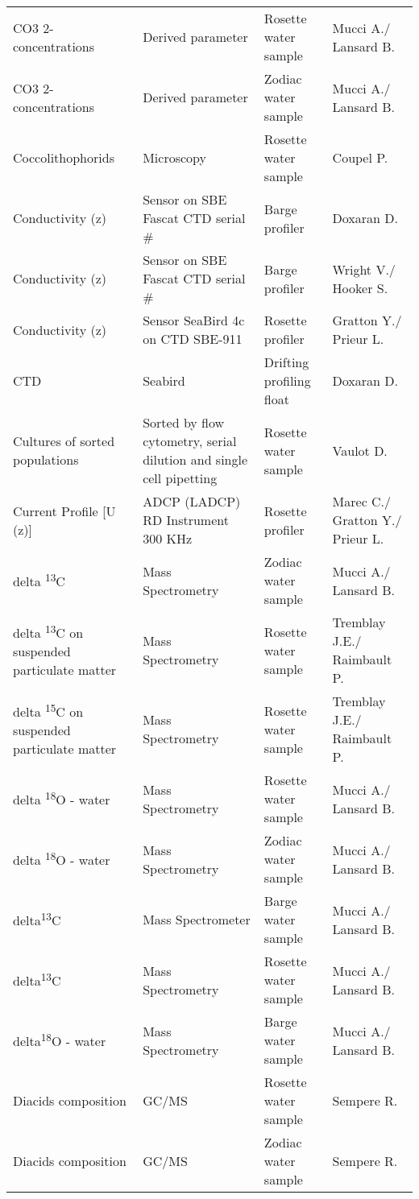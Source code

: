 \begin{longtable}[t]{llll}
CO3 2- concentrations & Derived parameter & Rosette water sample & Mucci A./ Lansard B.\\
\addlinespace
CO3 2- concentrations & Derived parameter & Zodiac water sample & Mucci A./ Lansard B.\\
Coccolithophorids & Microscopy & Rosette water sample & Coupel P.\\
Conductivity (z) & Sensor on SBE Fascat CTD serial \# & Barge profiler & Doxaran D.\\
Conductivity (z) & Sensor on SBE Fascat CTD serial \# & Barge profiler & Wright V./ Hooker S.\\
Conductivity (z) & Sensor SeaBird 4c on CTD SBE-911 & Rosette profiler & Gratton Y./ Prieur L.\\
\addlinespace
CTD & Seabird & Drifting profiling float & Doxaran D.\\
Cultures of sorted populations & Sorted by flow cytometry, serial dilution and single cell pipetting & Rosette water sample & Vaulot D.\\
Current Profile [U (z)] & ADCP (LADCP) RD Instrument 300 KHz & Rosette profiler & Marec C./ Gratton Y./ Prieur L.\\
delta \textsuperscript{13}C & Mass Spectrometry & Zodiac water sample & Mucci A./ Lansard B.\\
delta \textsuperscript{13}C on suspended particulate matter & Mass Spectrometry & Rosette water sample & Tremblay J.E./ Raimbault P.\\
\addlinespace
delta \textsuperscript{15}C on suspended particulate matter & Mass Spectrometry & Rosette water sample & Tremblay J.E./ Raimbault P.\\
delta \textsuperscript{18}O - water & Mass Spectrometry & Rosette water sample & Mucci A./ Lansard B.\\
delta \textsuperscript{18}O - water & Mass Spectrometry & Zodiac water sample & Mucci A./ Lansard B.\\
delta\textsuperscript{13}C & Mass Spectrometer & Barge water sample & Mucci A./ Lansard B.\\
delta\textsuperscript{13}C & Mass Spectrometry & Rosette water sample & Mucci A./ Lansard B.\\
\addlinespace
delta\textsuperscript{18}O - water & Mass Spectrometry & Barge water sample & Mucci A./ Lansard B.\\
Diacids composition & GC/MS & Rosette water sample & Sempere R.\\
Diacids composition & GC/MS & Zodiac water sample & Sempere R.\\

\end{longtable}
